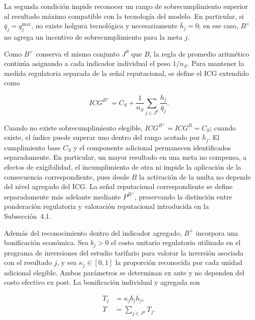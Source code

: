 La segunda condición impide reconocer un rango de sobrecumplimiento superior al resultado máximo compatible con la tecnología del modelo. En particular, si \(\bar q_j=q_j^{\max}\), no existe holgura tecnológica y necesariamente \(\bar h_j=0\); en ese caso, \(B^{+}\) no agrega un incentivo de sobrecumplimiento para la meta \(j\).

Como \(B^{+}\) conserva el mismo conjunto \(J^{S}\) que \(B\), la regla de promedio aritmético continúa asignando a cada indicador individual el peso \(1/n_S\). Para mantener la medida regulatoria separada de la señal reputacional, se define el ICG extendido como

\begin{equation}
\label{eq:cumplimiento_bplus}
ICG^{B^{+}}
=
C_S
+
\frac{1}{n_S}
\sum_{j\in J^{S}}
\frac{h_j}{\bar q_j}.
\end{equation}

Cuando no existe sobrecumplimiento elegible, \(ICG^{B^{+}}=ICG^B=C_S\); cuando existe, el índice puede superar uno dentro del rango acotado por \(\bar h_j\). El cumplimiento base \(C_S\) y el componente adicional permanecen identificados separadamente. En particular, un mayor resultado en una meta no compensa, a efectos de exigibilidad, el incumplimiento de otra ni impide la aplicación de la consecuencia correspondiente, pues desde \(B\) la activación de la multa no depende del nivel agregado del ICG. La señal reputacional correspondiente se define separadamente más adelante mediante \(P^{B^{+}}\), preservando la distinción entre ponderación regulatoria y valoración reputacional introducida en la Subsección~4.1.

Además del reconocimiento dentro del indicador agregado, \(B^{+}\) incorpora una bonificación económica. Sea \(b_j>0\) el costo unitario regulatorio utilizado en el programa de inversiones del estudio tarifario para valorar la inversión asociada con el resultado \(j\), y sea \(\kappa_j\in[0,1]\) la proporción reconocida por cada unidad adicional elegible. Ambos parámetros se determinan ex ante y no dependen del costo efectivo ex post. La bonificación individual y agregada son

\begin{subequations}
\label{eq:bonificacion_bplus}
\begin{align}
T_j
&=
\kappa_j b_j h_j,
\label{eq:premio_individual}
\\
T
&=
\sum_{j\in J^{S}}T_j.
\label{eq:premio_agregado}
\end{align}
\end{subequations}

